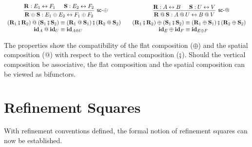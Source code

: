 \begin{theorem}
  \begin{gather*}
    \begin{prooftree}
      \hypo{\mathbf{R} : E_1 \leftrightarrow F_1}
      \hypo{\mathbf{S} : E_2 \leftrightarrow F_2}
      \infer2[\kw{sc}-$\oplus$]{
        \mathbf{R} \oplus \mathbf{S} : E_1 \oplus E_2 \leftrightarrow F_1 \oplus F_2
      }
    \end{prooftree}
    \hspace{8em}
    \begin{prooftree}
      \hypo{\mathbf{R} : A \leftrightarrow B}
      \hypo{\mathbf{S} : U \leftrightarrow V}
      \infer2[\kw{sc}-$\mathbin@$]{
        \mathbf{R} \mathbin@ \mathbf{S} : A \mathbin@ U \leftrightarrow B \mathbin@ V
      }
    \end{prooftree}
    \\
    \begin{array}{r@{}l}
      (\mathbf{R}_1 \vcomp \mathbf{R}_2) \mathbin@ (\mathbf{S}_1 \vcomp \mathbf{S}_2)
      & {} \equiv
      (\mathbf{R}_1 \mathbin@ \mathbf{S}_1) \vcomp (\mathbf{R}_2 \mathbin@ \mathbf{S}_2)
      \\
      \idsc_A \mathbin@ \idsc_U & {} \equiv \idsc_{A \mathbin@ U}
    \end{array}
    \quad
    \begin{array}{r@{}l}
      (\mathbf{R}_1 \vcomp \mathbf{R}_2) \oplus (\mathbf{S}_1 \vcomp \mathbf{S}_2)
      & {} \equiv
      (\mathbf{R}_1 \oplus \mathbf{S}_1) \vcomp (\mathbf{R}_2 \oplus \mathbf{S}_2)
      \\
      \idsc_E \oplus \idsc_F & {} \equiv \idsc_{E \oplus F}
    \end{array}
  \end{gather*}
\end{theorem}

The properties show the compatibility
of the flat composition ($\oplus$) and the spatial composition ($\mathbin@$)
with respect to the vertical composition ($\fatsemi$).
Should the vertical composition be associative,
the flat composition and the spatial composition
can be viewed as bifunctors.

\section{Refinement Squares}
\label{sec:rc:refsq}

With refinement conventions defined,
the formal notion of refinement squares
can now be established.

